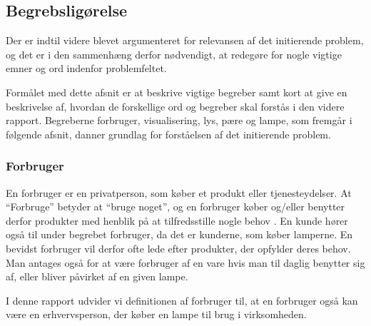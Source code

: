 \subsection{Begrebsligørelse}
Der er indtil videre blevet  argumenteret for relevansen af det initierende problem, og det er i den sammenhæng derfor nødvendigt, at redegøre for nogle vigtige emner og ord indenfor problemfeltet. 

Formålet med dette afsnit er at beskrive vigtige begreber samt kort at give en beskrivelse af, hvordan de forskellige ord og begreber skal forstås i den videre rapport. Begreberne forbruger, visualisering, lys, pære og lampe, som fremgår i følgende afsnit, danner grundlag for forståelsen af det initierende problem.


\subsubsection{Forbruger}
En forbruger er en privatperson, som køber et produkt eller tjenesteydelser. At “Forbruge” betyder at “bruge noget”, og en forbruger køber og/eller benytter derfor produkter med henblik på at tilfredsstille nogle behov \cite{forbrugerportalen}. En kunde hører også til under begrebet forbruger, da det er kunderne, som køber lamperne. En bevidst forbruger vil derfor ofte lede efter produkter, der opfylder deres behov. Man antages også for at være forbruger af en vare hvis man til daglig benytter sig af, eller bliver påvirket af en given lampe. 

I denne rapport udvider vi definitionen af forbruger til, at en forbruger også kan være en erhvervsperson, der køber en lampe til brug i virksomheden. 
 


